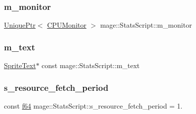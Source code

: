 \hypertarget{classmage_1_1_stats_script_a12e321d8fe1003de3643c4b799dd4c8f}{}\label{classmage_1_1_stats_script_a12e321d8fe1003de3643c4b799dd4c8f} 
\subsubsection{\texorpdfstring{m\+\_\+monitor}{m\_monitor}}
{\footnotesize\ttfamily \hyperlink{namespacemage_a3316d7143a973e37adf1110f2e80ca31}{Unique\+Ptr}$<$ \hyperlink{classmage_1_1_c_p_u_monitor}{C\+P\+U\+Monitor} $>$ mage\+::\+Stats\+Script\+::m\+\_\+monitor\hspace{0.3cm}{\ttfamily [private]}}

\hypertarget{classmage_1_1_stats_script_a15f95a755a20b01a80df24a8c073b6c5}{}\label{classmage_1_1_stats_script_a15f95a755a20b01a80df24a8c073b6c5} 
\subsubsection{\texorpdfstring{m\+\_\+text}{m\_text}}
{\footnotesize\ttfamily \hyperlink{classmage_1_1_sprite_text}{Sprite\+Text}$\ast$ const mage\+::\+Stats\+Script\+::m\+\_\+text\hspace{0.3cm}{\ttfamily [private]}}

\hypertarget{classmage_1_1_stats_script_aa8bf779ba6533bf97c5b72f1ff3b8da0}{}\label{classmage_1_1_stats_script_aa8bf779ba6533bf97c5b72f1ff3b8da0} 
\subsubsection{\texorpdfstring{s\+\_\+resource\+\_\+fetch\+\_\+period}{s\_resource\_fetch\_period}}
{\footnotesize\ttfamily const \hyperlink{namespacemage_ab935747c6941320bd6214b5a5f265b09}{f64} mage\+::\+Stats\+Script\+::s\+\_\+resource\+\_\+fetch\+\_\+period = 1.\hspace{0.3cm}{\ttfamily [static]}}

